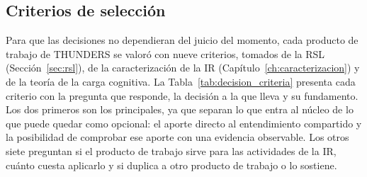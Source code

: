 \documentclass[12pt,letterpaper,oneside]{report}
\begin{document}
\subsection{Criterios de selección}
\label{sec:criterios_seleccion}
Para que las decisiones no dependieran del juicio del momento, cada producto de trabajo
de THUNDERS se valoró con nueve criterios, tomados de la RSL
(Sección~\ref{sec:rsl}), de la caracterización de la IR
(Capítulo~\ref{ch:caracterizacion}) y de la teoría de la carga cognitiva. La
Tabla~\ref{tab:decision_criteria} presenta cada criterio con la pregunta que
responde, la decisión a la que lleva y su fundamento. Los dos primeros son los
principales, ya que separan lo que entra al núcleo de lo que puede quedar como
opcional: el aporte directo al entendimiento compartido y la posibilidad de
comprobar ese aporte con una evidencia observable. Los otros siete preguntan si
el producto de trabajo sirve para las actividades de la IR, cuánto cuesta aplicarlo y si
duplica a otro producto de trabajo o lo sostiene.
\end{document}
